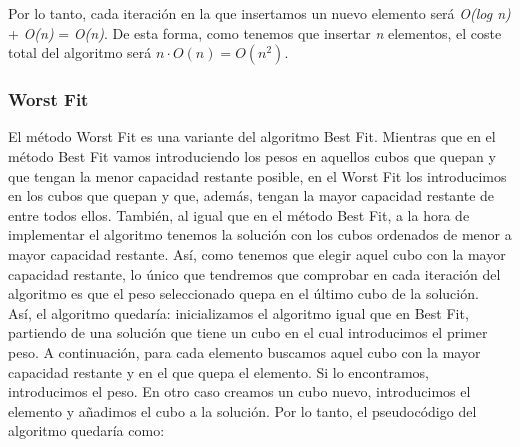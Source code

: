 \documentclass[a4paper, 12pt, oneside]{book}
\begin{document}
	Por lo tanto, cada iteraci\'on en la que insertamos un nuevo elemento ser\'a \textit{O(log n)} + \textit{O(n)} = \textit{O(n)}. De esta forma, como tenemos que insertar \textit{n} elementos, el coste total del algoritmo ser\'a $n \cdot O(n) = O(n^{2})$.
	
	\subsubsection{Worst Fit}
	El m\'etodo Worst Fit es una variante del algoritmo Best Fit. Mientras que en el m\'etodo Best Fit vamos introduciendo los pesos en aquellos cubos que quepan y que tengan la menor capacidad restante posible, en el Worst Fit los introducimos en los cubos que quepan y que, adem\'as, tengan la mayor capacidad restante de entre todos ellos. Tambi\'en, al igual que en el m\'etodo Best Fit, a la hora de implementar el algoritmo tenemos la soluci\'on con los cubos ordenados de menor a mayor capacidad restante. As\'i, como tenemos que elegir aquel cubo con la mayor capacidad restante, lo \'unico que tendremos que comprobar en cada iteraci\'on del algoritmo es que el peso seleccionado quepa en el \'ultimo cubo de la soluci\'on.
	\\
	
	As\'i, el algoritmo quedar\'ia: inicializamos el algoritmo igual que en Best Fit, partiendo de una soluci\'on que tiene un cubo en el cual introducimos el primer peso. A continuaci\'on, para cada elemento buscamos aquel cubo con la mayor capacidad restante y en el que quepa el elemento. Si lo encontramos, introducimos el peso. En otro caso creamos un cubo nuevo, introducimos el elemento y a\~{n}adimos el cubo a la soluci\'on. Por lo tanto, el pseudoc\'odigo del algoritmo quedar\'ia como:
	\\
	
\end{document}
